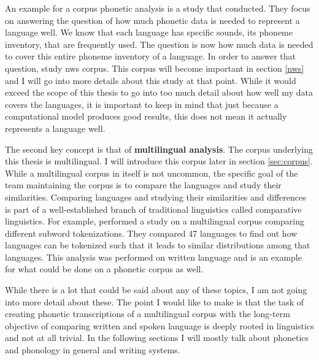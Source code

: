 An example for a corpus phonetic analysis is a study that \citet{baird_evans_greenhill_2021} conducted. They focus on answering the question of how much phonetic data is needed to represent a language well. We know that each language has specific sounds, its phoneme inventory, that are frequently used. The question is now how much data is needed to cover this entire phoneme inventory of a language. In order to answer that question, \citet{baird_evans_greenhill_2021} study \ac{nws} corpus. This corpus will become important in section \ref{nws} and I will go into more details about this study at that point. While it would exceed the scope of this thesis to go into too much detail about how well my data covers the languages, it is important to keep in mind that just because a computational model produces good results, this does not mean it actually represents a language well.  

The second key concept is that of \textbf{multilingual analysis}. The corpus underlying this thesis is multilingual. I will introduce this corpus later in section \ref{sec:corpus}. While a multilingual corpus in itself is not uncommon, the specific goal of the team maintaining the corpus is to compare the languages and study their similarities. Comparing languages and studying their similarities and differences is part of a well-established branch of traditional linguistics called comparative linguistics. For example, \citet{gutierrez-vasques-etal-2021-characters} performed a study on a multilingual corpus comparing different subword tokenizations. They compared 47 languages to find out how languages can be tokenized such that it leads to similar distributions among that languages. This analysis was performed on written language and is an example for what could be done on a phonetic corpus as well.

While there is a lot that could be said about any of these topics, I am not going into more detail about these. The point I would like to make is that the task of creating phonetic transcriptions of a multilingual corpus with the long-term objective of comparing written and spoken language is deeply rooted in linguistics and not at all trivial. In the following sections I will mostly talk about phonetics and phonology in general and writing systems.

